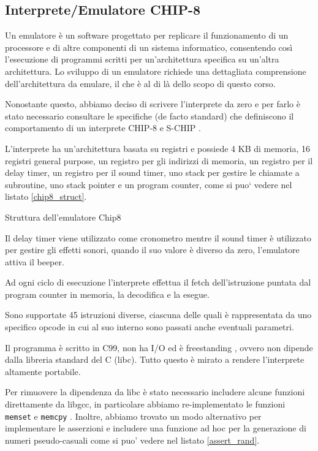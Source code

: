 \documentclass[a4paper]{article}
\begin{document}
\subsection{Interprete/Emulatore CHIP-8}

Un emulatore è un software progettato per replicare il funzionamento di un processore e di altre componenti di un sistema informatico, consentendo così l'esecuzione di programmi scritti per un'architettura specifica su un'altra architettura. Lo sviluppo di un emulatore richiede una dettagliata comprensione dell'architettura da emulare, il che è al di là dello scopo di questo corso.

Nonostante questo, abbiamo deciso di scrivere l'interprete da zero e per farlo è stato necessario consultare le specifiche (de facto standard) che definiscono il comportamento di un interprete CHIP-8 \cite{cowgod:chip8} e S-CHIP \cite{cowgod:schip}.

L'interprete ha un'architettura basata su registri e possiede 4 KB di memoria, 16 registri general purpose, un registro per gli indirizzi di memoria, un registro per il delay timer, un registro per il sound timer, uno stack per gestire le chiamate a subroutine, uno stack pointer e un program counter, come si puo` vedere nel listato \ref{chip8_struct}.

\begin{Listing}[h!t] %
    \centering
    \caption{Struttura dell'emulatore Chip8}
    \label{chip8_struct}
\end{Listing}

Il delay timer viene utilizzato come cronometro mentre il sound
timer è utilizzato per gestire gli effetti sonori, quando il suo
valore è diverso da zero, l'emulatore attiva il beeper.

Ad ogni ciclo di esecuzione l'interprete effettua il fetch
dell'istruzione puntata dal program counter in memoria,
la decodifica e la esegue.

Sono supportate 45 istruzioni diverse, ciascuna delle
quali è rappresentata da uno specifico opcode in cui al suo interno
sono passati anche eventuali parametri.

Il programma è scritto in C99, non ha I/O ed è freestanding
\cite{n1256:conformance}, ovvero non dipende dalla libreria
standard del C (libc). Tutto questo è mirato a rendere l'interprete
altamente portabile.

Per rimuovere la dipendenza da libc è stato necessario includere alcune funzioni direttamente da libgcc, in particolare abbiamo re-implementato le funzioni \texttt{memset} e \texttt{memcpy} . Inoltre, abbiamo trovato un modo alternativo per implementare le asserzioni e includere una funzione ad hoc per la generazione di numeri pseudo-casuali come si puo' vedere nel listato \ref{assert_rand}.
\end{document}
